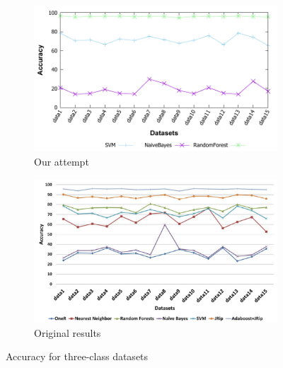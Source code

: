 \begin{figure}[H]
    \centering
    \begin{subfigure}[t]{0.5\textwidth}
        \includegraphics[width=\linewidth]{images/weka_accuracy3}
        \caption{Our attempt}
    \end{subfigure}%
    \begin{subfigure}[t]{0.5\textwidth}
        \includegraphics[width=\linewidth]{images/weka_accuracy3_cite.png}
        \caption{Original results \cite{borges_hink_machine_2014-1}}
    \end{subfigure}
    \caption{Accuracy for three-class datasets}
    \label{fig:weka_acc3}
\end{figure}

